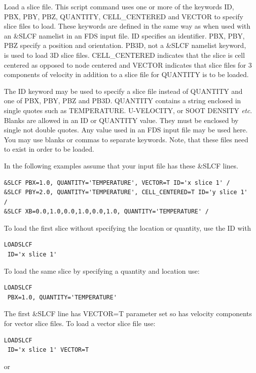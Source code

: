 \documentclass[11pt,twoside]{book}
\begin{document}
Load a slice file.
This script command uses one or more of the keywords ID, PBX, PBY, PBZ, QUANTITY, CELL\_CENTERED and VECTOR to specify slice files to load.
These keywords are defined in the same way as when used with an \&SLCF namelist in an FDS input file.
ID specifies an identifier.  PBX, PBY, PBZ specify a position and orientation.
PB3D, not a \&SLCF namelist keyword, is used to load 3D slice files.
CELL\_CENTERED indicates that the slice is cell centered as opposed to node centered
and VECTOR indicates that slice files for 3 components of velocity in addition to a slice file for QUANTITY is to be loaded.

The ID keyword may be used to specify a slice file instead of QUANTITY and one of PBX, PBY, PBZ and PB3D.
QUANTITY contains a string enclosed in single quotes such as
TEMPERATURE. U-VELOCITY, or SOOT DENSITY {\em etc}.
Blanks are allowed in an ID or QUANTITY value.  They must be enclosed by single not double quotes.
Any value used in an FDS input file may be used here. You may use blanks or commas to separate keywords.
Note, that these files need to exist in order to be loaded.

In the following examples assume that your input file has these  \&SLCF lines.

\begin{lstlisting}
&SLCF PBX=1.0, QUANTITY='TEMPERATURE', VECTOR=T ID='x slice 1' /
&SLCF PBY=2.0, QUANTITY='TEMPERATURE', CELL_CENTERED=T ID='y slice 1' /
&SLCF XB=0.0,1.0,0.0,1.0,0.0,1.0, QUANTITY='TEMPERATURE' /
\end{lstlisting}


\noindent To load the first slice without specifying the location or quantity, use the ID with
\begin{lstlisting}
LOADSLCF
 ID='x slice 1'
\end{lstlisting}

\noindent To load the same slice by specifying a quantity and location use:
\begin{lstlisting}
LOADSLCF
 PBX=1.0, QUANTITY='TEMPERATURE'
\end{lstlisting}

\noindent The first \&SLCF line has VECTOR=T parameter set so has velocity components for vector slice files.
To load a vector slice file use:
\begin{lstlisting}
LOADSLCF
 ID='x slice 1' VECTOR=T
\end{lstlisting}

\noindent or
\end{document}

